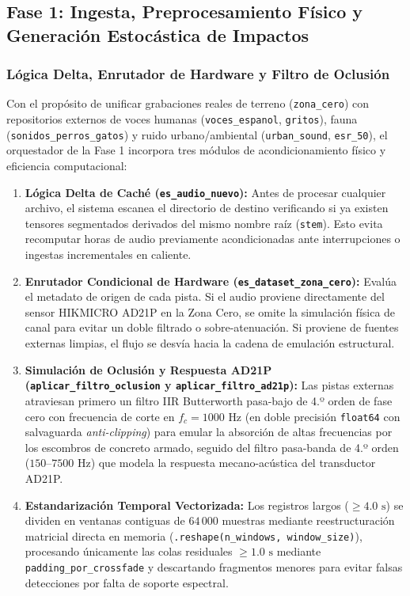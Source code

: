 \documentclass[11pt, a4paper]{article}
\begin{document}
\subsection{Fase 1: Ingesta, Preprocesamiento Físico y Generación Estocástica de Impactos}

\subsubsection{Lógica Delta, Enrutador de Hardware y Filtro de Oclusión}
Con el propósito de unificar grabaciones reales de terreno (\texttt{zona\_cero}) con repositorios externos de voces humanas (\texttt{voces\_espanol}, \texttt{gritos}), fauna (\texttt{sonidos\_perros\_gatos}) y ruido urbano/ambiental (\texttt{urban\_sound}, \texttt{esr\_50}), el orquestador de la Fase 1 incorpora tres módulos de acondicionamiento físico y eficiencia computacional:
\begin{enumerate}
    \item \textbf{Lógica Delta de Caché (\texttt{es\_audio\_nuevo}):} Antes de procesar cualquier archivo, el sistema escanea el directorio de destino verificando si ya existen tensores segmentados derivados del mismo nombre raíz (\texttt{stem}). Esto evita recomputar horas de audio previamente acondicionadas ante interrupciones o ingestas incrementales en caliente.
    \item \textbf{Enrutador Condicional de Hardware (\texttt{es\_dataset\_zona\_cero}):} Evalúa el metadato de origen de cada pista. Si el audio proviene directamente del sensor HIKMICRO AD21P en la Zona Cero, se omite la simulación física de canal para evitar un doble filtrado o sobre-atenuación. Si proviene de fuentes externas limpias, el flujo se desvía hacia la cadena de emulación estructural.
    \item \textbf{Simulación de Oclusión y Respuesta AD21P (\texttt{aplicar\_filtro\_oclusion} y \texttt{aplicar\_filtro\_ad21p}):} Las pistas externas atraviesan primero un filtro IIR Butterworth pasa-bajo de 4.º orden de fase cero con frecuencia de corte en $f_c = 1000\text{ Hz}$ (en doble precisión \texttt{float64} con salvaguarda \textit{anti-clipping}) para emular la absorción de altas frecuencias por los escombros de concreto armado, seguido del filtro pasa-banda de 4.º orden ($150\text{--}7500\text{ Hz}$) que modela la respuesta mecano-acústica del transductor AD21P.
    \item \textbf{Estandarización Temporal Vectorizada:} Los registros largos ($\ge 4.0\text{ s}$) se dividen en ventanas contiguas de $64\,000$ muestras mediante reestructuración matricial directa en memoria (\texttt{.reshape(n\_windows, window\_size)}), procesando únicamente las colas residuales $\ge 1.0\text{ s}$ mediante \texttt{padding\_por\_crossfade} y descartando fragmentos menores para evitar falsas detecciones por falta de soporte espectral.
\end{enumerate}
\end{document}
